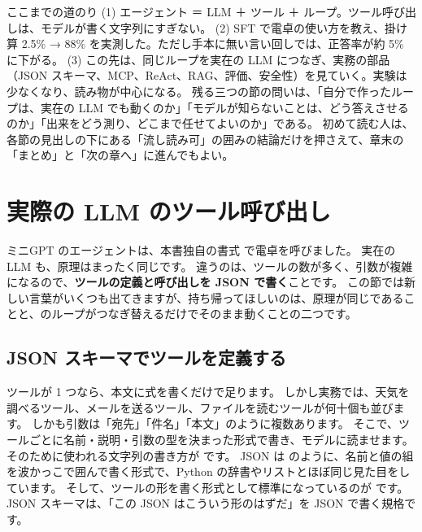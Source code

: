 \begin{intuition}{ここまでの道のり}
(1) エージェント ＝ LLM ＋ ツール ＋ ループ。ツール呼び出しは、モデルが書く文字列にすぎない。
(2) SFT で電卓の使い方を教え、掛け算 2.5\% → 88\% を実測した。ただし手本に無い言い回しでは、正答率が約 5\% に下がる。
(3) この先は、同じループを実在の LLM につなぎ、実務の部品（JSON スキーマ、MCP、ReAct、RAG、評価、安全性）を見ていく。実験は少なくなり、読み物が中心になる。
残る三つの節の問いは、「自分で作ったループは、実在の LLM でも動くのか」「モデルが知らないことは、どう答えさせるのか」「出来をどう測り、どこまで任せてよいのか」である。
初めて読む人は、各節の見出しの下にある「流し読み可」の囲みの結論だけを押さえて、章末の「まとめ」と「次の章へ」に進んでもよい。
\end{intuition}

\section{実際の LLM のツール呼び出し}\label{sec:agent-real}

ミニGPT のエージェントは、本書独自の書式  で電卓を呼びました。
実在の LLM も、原理はまったく同じです。
違うのは、ツールの数が多く、引数が複雑になるので、\textbf{ツールの定義と呼び出しを JSON で書く}ことです。
この節では新しい言葉がいくつも出てきますが、持ち帰ってほしいのは、原理が同じであることと、のループがつなぎ替えるだけでそのまま動くことの二つです。

\subsection{JSON スキーマでツールを定義する}

ツールが 1 つなら、本文に式を書くだけで足ります。
しかし実務では、天気を調べるツール、メールを送るツール、ファイルを読むツールが何十個も並びます。
しかも引数は「宛先」「件名」「本文」のように複数あります。
そこで、ツールごとに名前・説明・引数の型を決まった形式で書き、モデルに読ませます。
そのために使われる文字列の書き方が です。
JSON は  のように、名前と値の組を波かっこで囲んで書く形式で、Python の辞書やリストとほぼ同じ見た目をしています。
そして、ツールの形を書く形式として標準になっているのが です。
JSON スキーマは、「この JSON はこういう形のはずだ」を JSON で書く規格です。

